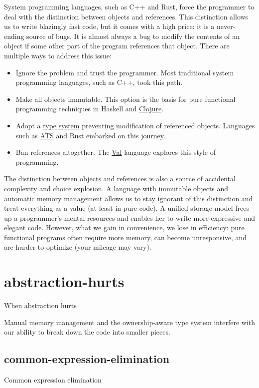 \documentclass{article}
\begin{document}
System programming languages, such as C++ and Rust, force the programmer to deal with the distinction between objects and references.
This distinction allows us to write blazingly fast code, but it comes with a high price: it is a never-ending source of bugs.
It is almost always a bug to modify the contents of an object if some other part of the program references that object.
There are multiple ways to address this issue:

\begin{itemize}
  \item
    Ignore the problem and trust the programmer.
    Most traditional system programming languages, such as C++, took this path.
  \item
    Make all objects immutable.
    This option is the basis for pure functional programming techniques in Haskell and \href{https://clojure.org/}{Clojure}.
  \item
    Adopt a \href{https://en.wikipedia.org/wiki/Substructural_type_system}{type system} preventing modification of referenced objects.
    Languages such as \href{https://www.cs.bu.edu/~hwxi/atslangweb/}{ATS} and Rust embarked on this journey.
  \item
    Ban references altogether.
    The \href{https://www.val-lang.dev/}{Val} language explores this style of programming.
\end{itemize}

The distinction between objects and references is also a source of accidental complexity and choice explosion.
A language with immutable objects and automatic memory management allows us to stay ignorant of this distinction and treat everything as a value (at least in pure code).
A unified storage model frees up a programmer's mental resources and enables her to write more expressive and elegant code.
However, what we gain in convenience, we lose in efficiency: pure functional programs often require more memory, can become unresponsive, and are harder to optimize (your mileage may vary).

\section{abstraction-hurts}{When abstraction hurts}

Manual memory management and the ownership-aware type system interfere with our ability to break down the code into smaller pieces.

\subsection{common-expression-elimination}{Common expression elimination}
\end{document}
